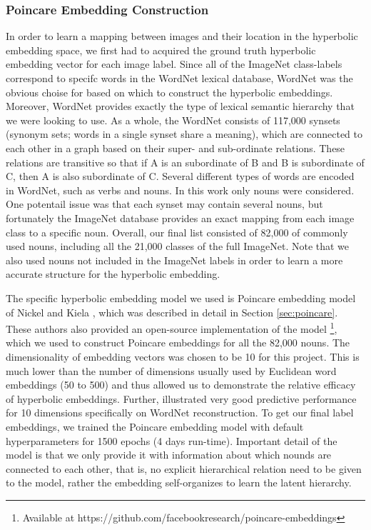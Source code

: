 \documentclass[12pt]{report}
\begin{document}
\subsubsection{Poincare Embedding Construction}
In order to learn a mapping between images and their location in the hyperbolic embedding space, we first had to acquired the ground truth hyperbolic embedding vector for each image label. Since all of the ImageNet class-labels correspond to specifc words in the WordNet lexical database, WordNet was the obvious choise for based on which to construct the hyperbolic embeddings. Moreover, WordNet provides exactly the type of lexical semantic hierarchy that we were looking to use. As a whole, the WordNet consists of 117,000 synsets (synonym sets; words in a single synset share a meaning), which are connected to each other in a graph based on their super- and sub-ordinate relations. These relations are transitive so that if A is an subordinate of B and B is subordinate of C, then A is also subordinate of C. Several different types of words are encoded in WordNet, such as verbs and nouns. In this work only nouns were considered. One potentail issue was that each synset may contain several nouns, but fortunately the ImageNet database provides an exact mapping from each image class to a specific noun. Overall, our final list consisted of 82,000 of commonly used nouns, including all the 21,000 classes of the full ImageNet. Note that we also used nouns not included in the ImageNet labels in order to learn a more accurate structure for the hyperbolic embedding.

The specific hyperbolic embedding model we used is Poincare embedding model of Nickel and Kiela \cite{Nickel2017}, which was described in detail in Section \ref{sec:poincare}. These authors also provided an open-source implementation of the model \footnote{Available at https://github.com/facebookresearch/poincare-embeddings}, which we used to construct Poincare embeddings for all the 82,000 nouns. The dimensionality of embedding vectors was chosen to be 10 for this project. This is much lower than the number of dimensions usually used by Euclidean word embeddings (50 to 500) and thus allowed us to demonstrate the relative efficacy of hyperbolic embeddings. Further, \cite{Nickel2017} illustrated very good predictive performance for 10 dimensions specifically on WordNet reconstruction. To get our final label embeddings, we trained the Poincare embedding model with default hyperparameters for 1500 epochs (4 days run-time). Important detail of the model is that we only provide it with information about which nounds are connected to each other, that is, no explicit hierarchical relation need to be given to the model, rather the embedding self-organizes to learn the latent hierarchy.
\end{document}
